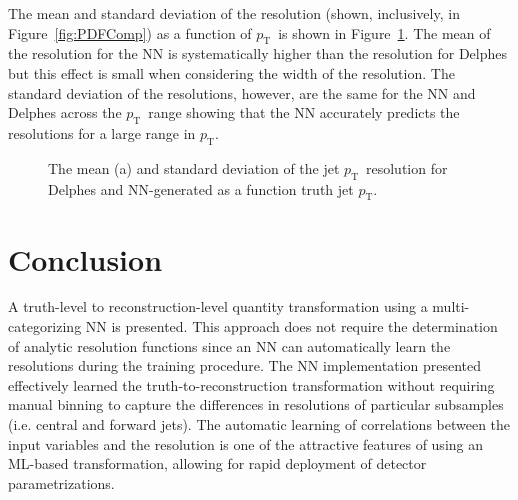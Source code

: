 \documentclass[showpacs,showkeys,preprint,prd,nofootinbib,linenumbers,12pt,superscriptaddress]{revtex4-1}
\def\pt{\ensuremath{p_{\mathrm{T}}}}
\begin{document}
The mean and standard deviation of the resolution (shown, inclusively, in Figure~\ref{fig:PDFComp}) as a function of \pt\ is shown in Figure~\ref{fig:resVsPt}. The mean of the resolution for the NN is systematically higher than the resolution for Delphes but this effect is small when considering the width of the resolution. The standard deviation of the resolutions, however, are the same for the NN and Delphes across the \pt\ range showing that the NN accurately predicts the resolutions for a large range in \pt. 

\begin{figure}[htb]
  \caption{The mean (a) and standard deviation of the jet \pt\ resolution for Delphes and NN-generated as a function truth jet \pt.}
  \label{fig:resVsPt}
\end{figure}

\section{Conclusion}
A truth-level to reconstruction-level quantity transformation using a multi-categorizing NN is presented. This approach does not require the determination of analytic resolution functions since an NN can automatically learn the resolutions during the training procedure. The NN implementation presented effectively learned the truth-to-reconstruction transformation without requiring manual binning to capture the differences in resolutions of particular subsamples (i.e. central and forward jets). The automatic learning of correlations between the input variables and the resolution is one of the attractive features of using an ML-based transformation, allowing for rapid deployment of detector parametrizations.
\end{document}
